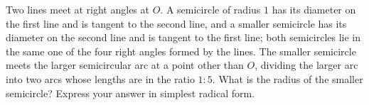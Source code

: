 Two lines meet at right angles at $O$. A semicircle of radius $1$ has its diameter on the first line and is tangent to the second line, and a smaller semicircle has its diameter on the second line and is tangent to the first line; both semicircles lie in the same one of the four right angles formed by the lines. The smaller semicircle meets the larger semicircular arc at a point other than $O$, dividing the larger arc into two arcs whose lengths are in the ratio $1:5$. What is the radius of the smaller semicircle? Express your answer in simplest radical form.
